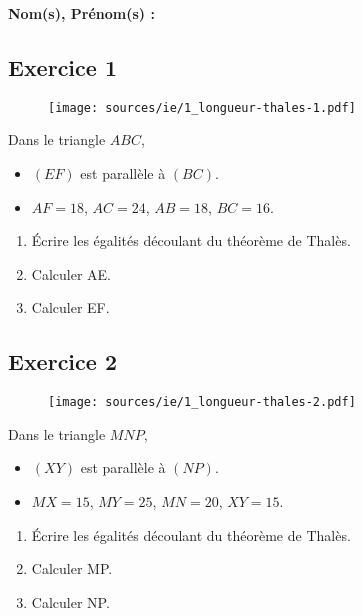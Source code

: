 \documentclass[12pt]{article}
\begin{document}

\setlength{\columnseprule}{1pt}

\textbf{Nom(s), Prénom(s) :}

\subsection*{Exercice 1}

\begin{multicols}{2}

  \begin{figure}[H]
    \centering
    \texttt{[image: sources/ie/1\_longueur-thales-1.pdf]}
  \end{figure}

  Dans le triangle $ABC$, 

  \begin{itemize}
  \item $(EF)$ est parallèle à $(BC)$.
  \item $AF = 18$, $AC = 24$, $AB = 18$, $BC = 16$.
  \end{itemize}

  \begin{enumerate}
  \item Écrire les égalités découlant du théorème de Thalès.
  \item Calculer AE.
  \item Calculer EF.
  \end{enumerate}

\end{multicols}
\subsection*{Exercice 2}

\begin{multicols}{2}

  \begin{figure}[H]
    \centering
    \texttt{[image: sources/ie/1\_longueur-thales-2.pdf]}
  \end{figure}

  Dans le triangle $MNP$, 

  \begin{itemize}
  \item $(XY)$ est parallèle à $(NP)$.
  \item $MX = 15$, $MY = 25$, $MN = 20$, $XY = 15$.
  \end{itemize}

  \begin{enumerate}
  \item Écrire les égalités découlant du théorème de Thalès.
  \item Calculer MP.
  \item Calculer NP.
  \end{enumerate}

\end{multicols}
\end{document}
